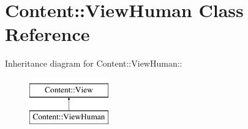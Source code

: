 \hypertarget{classContent_1_1ViewHuman}{
\section{Content::ViewHuman Class Reference}
\label{classContent_1_1ViewHuman}
}
Inheritance diagram for Content::ViewHuman::\begin{figure}[H]
\begin{center}
\leavevmode
\includegraphics[height=2cm]{classContent_1_1ViewHuman}
\end{center}
\end{figure}
